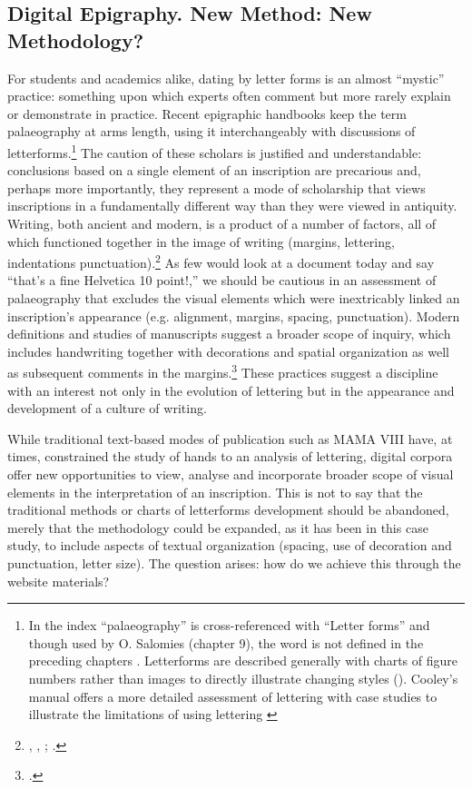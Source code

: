 \documentclass[amsthm,ebook]{saparticle}
\begin{document}
\subsection{Digital Epigraphy. New Method: New Methodology?}
\noindent For students and academics alike, dating by letter forms is an almost ``mystic'' practice: something upon which experts
often comment but more rarely explain or demonstrate in practice. Recent epigraphic handbooks keep the term
palaeography at arms length, using it interchangeably with discussions of letterforms.\footnote{In the index \citep[880]{bruun2015} ``palaeography'' is cross-referenced with ``Letter forms'' and though used by O.
Salomies (chapter 9), the word is not defined in the preceding chapters \citep[155]{bruun2015}.
Letterforms are described generally with charts of figure numbers rather than images to directly illustrate changing
styles (\citep[123-4]{bruun2015}). Cooley’s manual offers a more detailed assessment of lettering with case studies to
illustrate the limitations of using lettering \citep[423-33]{cooley2012}} The caution of these scholars is justified and
understandable: conclusions based on a single element of an inscription are precarious and, perhaps more importantly,
they represent a mode of scholarship that views inscriptions in a fundamentally different way than they were viewed in
antiquity. Writing, both ancient and modern, is a product of a number of factors, all of which functioned together in
the image of writing (margins, lettering, indentations punctuation).\footnote{\citet[25-27]{woolf1996}, \citet[3-5]{bodel2001},
\citet[433-437]{cooley2012}; \citet[1-10]{panciera2012}.} As few would look at a document today and say ``that’s a fine Helvetica
10 point!,'' we should be cautious in an assessment of palaeography that excludes the visual elements which were
inextricably linked an inscription’s appearance (e.g. alignment, margins, spacing, punctuation). Modern definitions and
studies of manuscripts suggest a broader scope of inquiry, which includes handwriting together with decorations and
spatial organization as well as subsequent comments in the margins.\footnote{\citet[21-37]{buonocore2015}. } These
practices suggest a discipline with an interest not only in the evolution of lettering but in the appearance and
development of a culture of writing. 




While traditional text-based modes of publication such as MAMA VIII have, at times, constrained the study of hands to an
analysis of lettering, digital corpora offer new opportunities to view, analyse and incorporate broader scope of visual
elements in the interpretation of an inscription. This is not to say that the traditional methods or charts of
letterforms development should be abandoned, merely that the methodology could be expanded, as it has been in this case
study, to include aspects of textual organization (spacing, use of decoration and punctuation, letter size). The
question arises: how do we achieve this through the website materials? 
\end{document}
